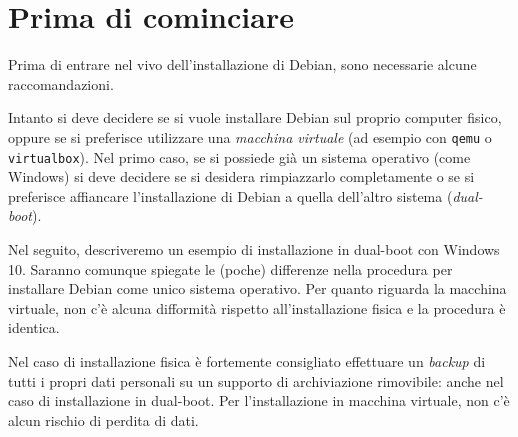 \section{Prima di cominciare}
Prima di entrare nel vivo dell'installazione di Debian, sono necessarie alcune raccomandazioni.

Intanto si deve decidere se si vuole installare Debian sul proprio computer fisico, oppure se si preferisce utilizzare una \textit{macchina virtuale} (ad esempio con \texttt{qemu} o \texttt{virtualbox}). Nel primo caso, se si possiede già un sistema operativo (come Windows) si deve decidere se si desidera rimpiazzarlo completamente o se si preferisce affiancare l'installazione di Debian a quella dell'altro sistema (\textit{dual-boot}).

Nel seguito, descriveremo un esempio di installazione in dual-boot con Windows 10. Saranno comunque spiegate le (poche) differenze nella procedura per installare Debian come unico sistema operativo. Per quanto riguarda la macchina virtuale, non c'è alcuna difformità rispetto all'installazione fisica e la procedura è identica.

Nel caso di installazione fisica è fortemente consigliato effettuare un \textit{backup} di tutti i propri dati personali su un supporto di archiviazione rimovibile: anche nel caso di installazione in dual-boot. Per l'installazione in macchina virtuale, non c'è alcun rischio di perdita di dati.
